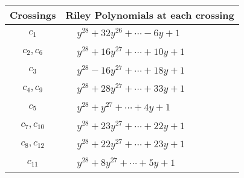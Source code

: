 \documentclass[1p]{elsarticle_modified}
\theoremstyle{definition}
\begin{document}
\begin{tabular}{m{50pt}|m{274pt}}
Crossings & \hspace{64pt}Riley Polynomials at each crossing \\
\hline $$\begin{aligned}c_{1}\end{aligned}$$&$\begin{aligned}
&y^{28}+32 y^{26}+\cdots-6 y+1
\end{aligned}$\\
\hline $$\begin{aligned}c_{2},c_{6}\end{aligned}$$&$\begin{aligned}
&y^{28}+16 y^{27}+\cdots+10 y+1
\end{aligned}$\\
\hline $$\begin{aligned}c_{3}\end{aligned}$$&$\begin{aligned}
&y^{28}-16 y^{27}+\cdots+18 y+1
\end{aligned}$\\
\hline $$\begin{aligned}c_{4},c_{9}\end{aligned}$$&$\begin{aligned}
&y^{28}+28 y^{27}+\cdots+33 y+1
\end{aligned}$\\
\hline $$\begin{aligned}c_{5}\end{aligned}$$&$\begin{aligned}
&y^{28}+y^{27}+\cdots+4 y+1
\end{aligned}$\\
\hline $$\begin{aligned}c_{7},c_{10}\end{aligned}$$&$\begin{aligned}
&y^{28}+23 y^{27}+\cdots+22 y+1
\end{aligned}$\\
\hline $$\begin{aligned}c_{8},c_{12}\end{aligned}$$&$\begin{aligned}
&y^{28}+22 y^{27}+\cdots+23 y+1
\end{aligned}$\\
\hline $$\begin{aligned}c_{11}\end{aligned}$$&$\begin{aligned}
&y^{28}+8 y^{27}+\cdots+5 y+1
\end{aligned}$\\
\hline
\end{tabular}\\~\\
\end{document}
